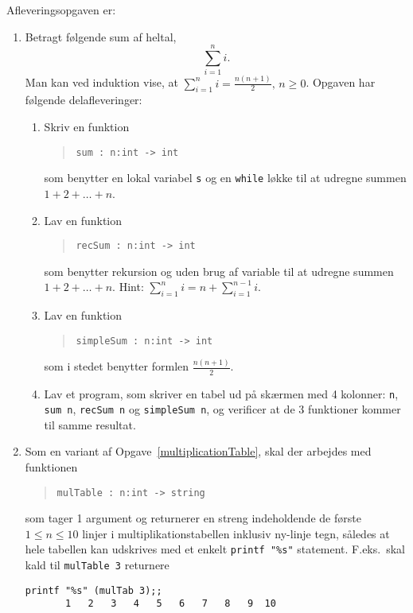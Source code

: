 \documentclass[a4paper,12pt]{article}
\begin{document}
Afleveringsopgaven er:
\begin{enumerate}[label=3i.\arabic*,start=0]
\item Betragt følgende sum af heltal,
  \begin{equation}
    \sum_{i=1}^n i.
  \end{equation}
  Man kan ved induktion vise, at $\sum_{i=1}^n i = \frac{n(n+1)}{2},\, n\geq 0$. Opgaven har følgende delafleveringer:
  \begin{enumerate}
  \item \label{sum} Skriv en funktion
    \begin{quote}
      \mbox{\lstinline!sum : n:int -> int!}
    \end{quote}
    som benytter en lokal variabel \lstinline!s! og en \lstinline!while! løkke til at udregne summen $1 + 2 + \dots + n$.
  \item Lav en funktion
    \begin{quote}
      \mbox{\lstinline!recSum : n:int -> int!}
    \end{quote}
 som benytter rekursion og uden brug af variable til at udregne summen $1 + 2 + \dots + n$. Hint: $\sum_{i=1}^n i = n + \sum_{i=1}^{n-1} i$.
  \item Lav en funktion
    \begin{quote}
      \mbox{\lstinline!simpleSum : n:int -> int!}
    \end{quote}
som i stedet benytter formlen $\frac{n(n+1)}{2}$.
  \item Lav et program, som skriver en tabel ud på skærmen med 4 kolonner: \lstinline!n!, \lstinline!sum n!, \mbox{\lstinline!recSum n!} og \mbox{\lstinline!simpleSum n!}, og verificer at de 3 funktioner kommer til samme resultat.
  \end{enumerate}
\item Som en variant af Opgave~\ref{multiplicationTable}, skal der arbejdes med funktionen
  \begin{quote}
    \mbox{\lstinline!mulTable : n:int -> string!}
  \end{quote}
  som tager 1 argument og returnerer en streng indeholdende de første $1\leq n\leq 10$ linjer i multiplikationstabellen inklusiv ny-linje tegn, således at hele tabellen kan udskrives med et enkelt \lstinline!printf "%s"! statement. F.eks.\ skal kald til \mbox{\lstinline!mulTable 3!} returnere
\begin{lstlisting}[caption=Example of use and output from \lstinline!mulTab!,label=mulTab]
printf "%s" (mulTab 3);;
       1   2   3   4   5   6   7   8   9  10

\end{lstlisting}
\end{enumerate}
\end{document}
